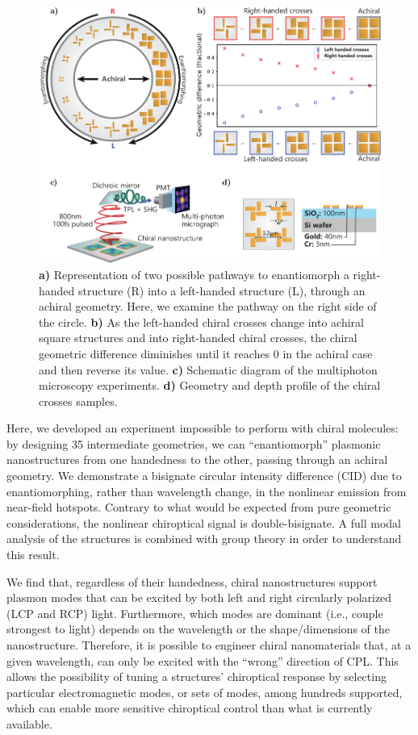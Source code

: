 \begin{figure}[htb]	
    \centering	
    \includegraphics[scale=1]{./figures/results/EnantiomorphingChiralCrosses/setup.pdf}
    \caption{\label{fig:results:EnantiomorphingChiralCrosses:setup}
    \textbf{a)} Representation of two possible pathways to enantiomorph a right-handed structure (R) into a left-handed structure (L), through an achiral geometry. Here, we examine the pathway on the right side of the circle. \textbf{b)} As the left-handed chiral crosses change into achiral square structures and into right-handed chiral crosses, the chiral geometric difference diminishes until it reaches 0 in the achiral case and then reverse its value. \textbf{c)} Schematic diagram of the multiphoton microscopy experiments. \textbf{d)} Geometry and depth profile of the chiral crosses samples.}	
\end{figure}

Here, we developed an experiment impossible to perform with chiral molecules: by designing 35 intermediate geometries, we can ``enantiomorph'' plasmonic nanostructures from one handedness to the other, passing through an achiral geometry. 
We demonstrate a bisignate circular intensity difference (CID) due to enantiomorphing, rather than wavelength change, in the nonlinear emission from near-field hotspots. Contrary to what would be expected from pure geometric considerations, the nonlinear chiroptical signal is double-bisignate. A full modal analysis of the structures is combined with group theory in order to understand this result. 

We find that, regardless of their handedness, chiral nanostructures support plasmon modes that can be excited by both left and right circularly polarized (LCP and RCP) light. Furthermore, which modes are dominant (i.e., couple strongest to light) depends on the wavelength or the shape/dimensions of the nanostructure. Therefore, it is possible to engineer chiral nanomaterials that, at a given wavelength, can only be excited with the ``wrong'' direction of CPL. 
This allows the possibility of tuning a structures' chiroptical response by selecting particular electromagnetic modes, or sets of modes, among hundreds supported, which can enable more sensitive chiroptical control than what is currently available.

